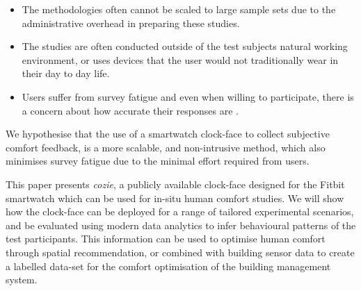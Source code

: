 








\begin{itemize}
  \item The methodologies often cannot be scaled to large sample sets due to the administrative overhead in preparing these studies.
  \item The studies are often conducted outside of the test subjects natural working environment, or uses devices that the user would not traditionally wear in their day to day life. 
  \item Users suffer from survey fatigue \cite{porter2004multiple} and even when willing to participate, there is a concern about how accurate their responses are \cite{Clear2018}.
\end{itemize}

We hypothesise that the use of a smartwatch clock-face to collect subjective comfort feedback, is a more scalable, and non-intrusive method, which also minimises survey fatigue due to the minimal effort required from users. 

This paper presents \emph{cozie}, a publicly available clock-face designed for the Fitbit smartwatch which can be used for in-situ human comfort studies. We will show how the clock-face can be deployed for a range of tailored experimental scenarios, and be evaluated using modern data analytics to infer behavioural patterns of the test participants. This information can be used to optimise human comfort through spatial recommendation, or combined with building sensor data to create a labelled data-set for the comfort optimisation of the building management system. 

